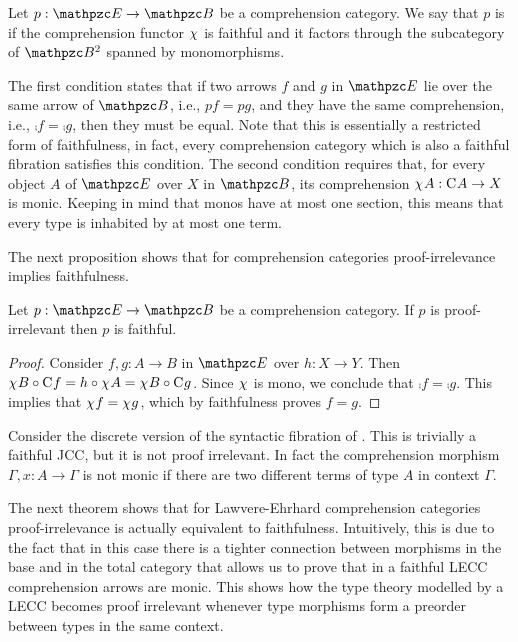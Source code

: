 \documentclass{lmcs} %
\theoremstyle{plain}\newtheorem{satz}[thm]{Satz} %
\begin{document}
\begin{defi} \label{def:proof-irrelevant}
Let $p : \ct{E}\to\ct{B}$ be a comprehension category. 
We say that $p$ is  if 
the comprehension functor $\chi^{}$ is faithful and 
it factors through the subcategory of $\Arr{\ct{B}}$ spanned by monomorphisms. 
\end{defi}

The first condition states that if two arrows $f$ and $g$ in $\ct{E}$ lie over the same arrow of $\ct{B}$, i.e., $pf = pg$, and 
they have the same comprehension, i.e., $\comp{} f = \comp{} g$, then they must be equal. 
Note that this is essentially a restricted form of faithfulness, in fact, 
every comprehension category which is also a faithful fibration satisfies this condition. 
% 
The second condition requires that, for every object $A$ of $\ct{E}$ over $X$ in $\ct{B}$, its comprehension $\chi^{}A : \mathrm{C}^{}A \to X$ is monic. Keeping in mind that monos have at most one section, this means that every type is inhabited by at most one term. 

The next proposition shows that for comprehension categories proof-irrelevance implies faithfulness. 

			\begin{prop}\label{prop:faith}
Let $p : \ct{E} \to \ct{B}$  be a comprehension category. 
If $p$ is proof-irrelevant then $p$ is faithful. 
			\end{prop}
			
			\begin{proof}
				Consider $f,g:A\to B$ in $\ct{E}$ over $h:X\to Y$. Then $\chi^{}B\circ \mathrm{C}^{}f=h\circ \chi^{}A=\chi^{}B\circ\mathrm{C}^{}g$. Since $\chi^{}$ is mono, we conclude that $\comp{}f=\comp{}g$. This implies that $\chi^{}f=\chi^{}g$, which by faithfulness proves $f=g$.
			\end{proof}
			
			\begin{exa}
				Consider the discrete version of the syntactic fibration of . This is trivially a faithful JCC, but it is not proof irrelevant. In fact the comprehension morphism $\Gamma, x:A\to \Gamma$ is not monic if there are two different terms of type $A$ in context $\Gamma$.
			\end{exa}

The next theorem shows that for Lawvere-Ehrhard comprehension categories proof-irrelevance is actually equivalent to faithfulness. 
Intuitively, this is due to the fact that in this case there is a tighter connection between  morphisms in the base and in the total category that allows us to prove that in a faithful LECC comprehension arrows are monic. 
This shows how the type theory modelled by a LECC becomes proof irrelevant whenever type morphisms form a preorder between types in the same context.
\end{document}

